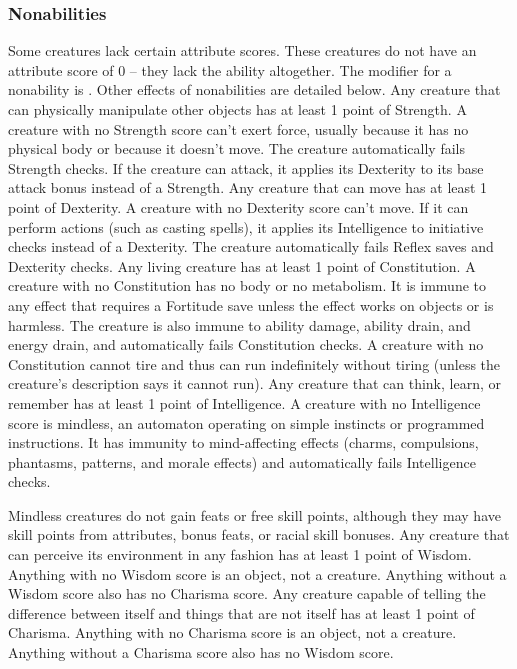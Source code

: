 {\subsubsection{Nonabilities} Some creatures lack certain attribute scores. These creatures do not have an attribute score of 0 -- they lack the ability altogether. The modifier for a nonability is . Other effects of nonabilities are detailed below.
 Any creature that can physically manipulate other objects has at least 1 point of Strength. A creature with no Strength score can't exert force, usually because it has no physical body or because it doesn't move. The creature automatically fails Strength checks. If the creature can attack, it applies its Dexterity to its base attack bonus instead of a Strength.
 Any creature that can move has at least 1 point of Dexterity. A creature with no Dexterity score can't move. If it can perform actions (such as casting spells), it applies its Intelligence to initiative checks instead of a Dexterity. The creature automatically fails Reflex saves and Dexterity checks.
 Any living creature has at least 1 point of Constitution. A creature with no Constitution has no body or no metabolism. It is immune to any effect that requires a Fortitude save unless the effect works on objects or is harmless. The creature is also immune to ability damage, ability drain, and energy drain, and automatically fails Constitution checks. A creature with no Constitution cannot tire and thus can run indefinitely without tiring (unless the creature's description says it cannot run).
 Any creature that can think, learn, or remember has at least 1 point of Intelligence. A creature with no Intelligence score is mindless, an automaton operating on simple instincts or programmed instructions. It has immunity to mind-affecting effects (charms, compulsions, phantasms, patterns, and morale effects) and automatically fails Intelligence checks.
\par Mindless creatures do not gain feats or free skill points, although they may have skill points from attributes, bonus feats, or racial skill bonuses.
 Any creature that can perceive its environment in any fashion has at least 1 point of Wisdom. Anything with no Wisdom score is an object, not a creature. Anything without a Wisdom score also has no Charisma score.
 Any creature capable of telling the difference between itself and things that are not itself has at least 1 point of Charisma. Anything with no Charisma score is an object, not a creature. Anything without a Charisma score also has no Wisdom score.

}
